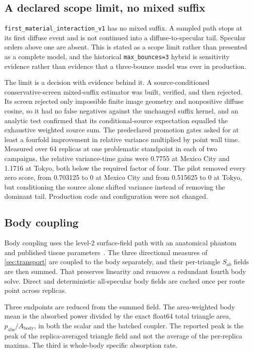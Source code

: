 \subsection{A declared scope limit, no mixed suffix}
\label{sec:no-suffix}

\texttt{first\_material\_interaction\_v1} has no mixed suffix. A sampled path
stops at its first diffuse event and is not continued into a
diffuse-to-specular tail. Specular orders above one are absent. This is stated
as a scope limit rather than presented as a complete model, and the historical
\texttt{max\_bounces=3} hybrid is sensitivity evidence rather than evidence
that a three-bounce model was ever in production.

The limit is a decision with evidence behind it. A source-conditioned
conservative-screen mixed-suffix estimator was built, verified, and then
rejected. Its screen rejected only impossible finite image geometry and
nonpositive diffuse cosine, so it had no false negatives against the unchanged
suffix kernel, and an analytic test confirmed that its conditional-source
expectation equalled the exhaustive weighted source sum. The predeclared
promotion gates asked for at least a fourfold improvement in relative variance
multiplied by point wall time. Measured over 64 replicas at one problematic
standpoint in each of two campaigns, the relative variance-time gains were
0.7755 at Mexico City and 1.1716 at Tokyo, both below the required factor of
four. The pilot removed every zero score, from 0.703125 to 0 at Mexico City and
from 0.515625 to 0 at Tokyo, but conditioning the source alone shifted variance
instead of removing the dominant tail. Production code and configuration were
not changed.

\subsection{Body coupling}
\label{sec:body}

Body coupling uses the level-2 surface-field path with an anatomical phantom
and published tissue parameters~\cite{aegis, itis}. The three directional
measures of \cref{sec:transport} are coupled to the body separately, and their
per-triangle $S_{ab}$ fields are then summed. That preserves linearity and
removes a redundant fourth body solve. Direct and deterministic all-specular
body fields are cached once per route point across replicas.

Three endpoints are reduced from the summed field. The area-weighted body mean
is the absorbed power divided by the exact float64 total triangle area,
$p_{\mathrm{abs}} / A_{\mathrm{body}}$, in both the scalar and the batched
coupler. The reported peak is the peak of the replica-averaged triangle field
and not the average of the per-replica maxima. The third is whole-body specific
absorption rate.

